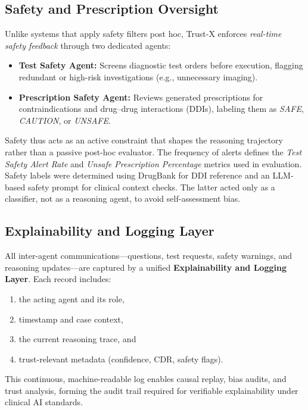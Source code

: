\documentclass[letterpaper]{article} %
\begin{document}
\subsection{Safety and Prescription Oversight}

Unlike systems that apply safety filters post hoc, Trust-X enforces \textit{real-time safety feedback} through two dedicated agents:

\begin{itemize}
    \item \textbf{Test Safety Agent:} Screens diagnostic test orders before execution, flagging redundant or high-risk investigations (e.g., unnecessary imaging).
    \item \textbf{Prescription Safety Agent:} Reviews generated prescriptions for contraindications and drug–drug interactions (DDIs), labeling them as \textit{SAFE}, \textit{CAUTION}, or \textit{UNSAFE}.
\end{itemize}

Safety thus acts as an active constraint that shapes the reasoning trajectory rather than a passive post-hoc evaluator. 
The frequency of alerts defines the \textit{Test Safety Alert Rate} and \textit{Unsafe Prescription Percentage} metrics used in evaluation.
Safety labels were determined using DrugBank \cite{wishart2018drugbank} for DDI reference and an LLM-based safety prompt for clinical context checks.
The latter acted only as a classifier, not as a reasoning agent, to avoid self-assessment bias.


\subsection{Explainability and Logging Layer}

All inter-agent communications—questions, test requests, safety warnings, and reasoning updates—are captured by a unified \textbf{Explainability and Logging Layer}. 
Each record includes:
\begin{enumerate}
    \item the acting agent and its role,
    \item timestamp and case context,
    \item the current reasoning trace, and
    \item trust-relevant metadata (confidence, CDR, safety flags).
\end{enumerate}
This continuous, machine-readable log enables causal replay, bias audits, and trust analysis, forming the audit trail required for verifiable explainability under clinical AI standards.
\end{document}

